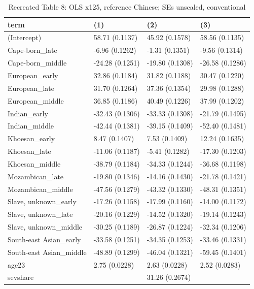 \begin{table}

\caption{Recreated Table 8: OLS x125, reference Chinese; SEs unscaled, conventional}
\centering
\begin{tabular}[t]{llll}
\toprule
term & (1) & (2) & (3)\\
\midrule
(Intercept) & 58.71 (0.1137) & 45.92 (0.1578) & 58.56 (0.1135)\\
Cape-born\_late & -6.96 (0.1262) & -1.31 (0.1351) & -9.56 (0.1314)\\
Cape-born\_middle & -24.28 (0.1251) & -19.80 (0.1308) & -26.58 (0.1286)\\
European\_early & 32.86 (0.1184) & 31.82 (0.1188) & 30.47 (0.1220)\\
European\_late & 31.70 (0.1264) & 37.36 (0.1354) & 29.98 (0.1288)\\
\addlinespace
European\_middle & 36.85 (0.1186) & 40.49 (0.1226) & 37.99 (0.1202)\\
Indian\_early & -32.43 (0.1306) & -33.33 (0.1308) & -21.79 (0.1495)\\
Indian\_middle & -42.44 (0.1381) & -39.15 (0.1409) & -52.40 (0.1481)\\
Khoesan\_early & 8.47 (0.1407) & 7.53 (0.1409) & 12.24 (0.1635)\\
Khoesan\_late & -11.06 (0.1187) & -5.41 (0.1282) & -17.30 (0.1203)\\
\addlinespace
Khoesan\_middle & -38.79 (0.1184) & -34.33 (0.1244) & -36.68 (0.1198)\\
Mozambican\_late & -19.80 (0.1346) & -14.16 (0.1430) & -21.78 (0.1421)\\
Mozambican\_middle & -47.56 (0.1279) & -43.32 (0.1330) & -48.31 (0.1351)\\
Slave, unknown\_early & -17.26 (0.1158) & -17.99 (0.1160) & -14.00 (0.1172)\\
Slave, unknown\_late & -20.16 (0.1229) & -14.52 (0.1320) & -19.14 (0.1243)\\
\addlinespace
Slave, unknown\_middle & -30.25 (0.1189) & -26.87 (0.1224) & -32.34 (0.1206)\\
South-east Asian\_early & -33.58 (0.1251) & -34.35 (0.1253) & -33.46 (0.1331)\\
South-east Asian\_middle & -48.89 (0.1299) & -46.04 (0.1321) & -59.45 (0.1401)\\
age23 & 2.75 (0.0228) & 2.63 (0.0228) & 2.52 (0.0283)\\
sevshare &  & 31.26 (0.2674) & \\
\bottomrule
\end{tabular}
\end{table}
